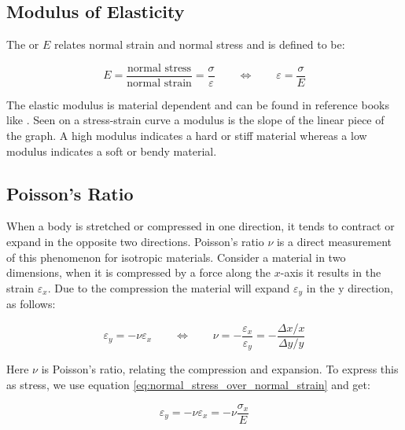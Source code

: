 \subsection{Modulus of Elasticity}
The  or  $E$ relates normal
strain and normal stress and is defined to be:

\begin{equation}
\label{eq:normal_stress_over_normal_strain}
  E =  \frac{\mbox{normal stress}}{\mbox{normal strain}}
  = \frac{\sigma}{\varepsilon}
  \qquad \Leftrightarrow \qquad
  \varepsilon = \frac{\sigma}{E}
\end{equation}

The elastic modulus is
material dependent and can be found in reference books like
. Seen on a stress-strain curve a 
modulus is the slope of the linear piece of the graph. A high modulus 
indicates a hard or stiff material whereas a low modulus indicates a
soft or bendy material.

\subsection{Poisson's Ratio}
\label{sec:poissons_ratio}
When a body is stretched or compressed in one direction, it tends to
contract or expand in the opposite two directions. Poisson's ratio
$\nu$ is a direct measurement of this phenomenon for isotropic
materials. Consider a material in two dimensions, when it is
compressed by a force along the $x$-axis it results in the strain
$\varepsilon_x$. Due to the compression the material will expand 
$\varepsilon_y$ in the y direction, as follows:

\begin{equation}
  \varepsilon_y = - \nu \varepsilon_x
    \qquad \Leftrightarrow \qquad
    \nu =
    -\frac{\varepsilon_x}{\varepsilon_y} =
    -\frac{\Delta x / x}{\Delta y / y}
\end{equation}

Here $\nu$ is Poisson's ratio, relating the compression and
expansion. To express this as stress, we use equation
\eqref{eq:normal_stress_over_normal_strain} and get:

\begin{equation}
  \varepsilon_y = - \nu \varepsilon_x = - \nu \frac{\sigma_x}{E}
\end{equation}

